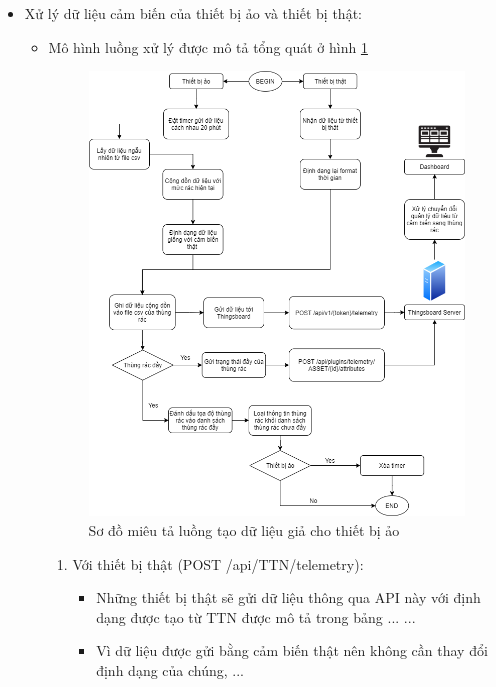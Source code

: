\begin{itemize}
    \item Xử lý dữ liệu cảm biến của thiết bị ảo và thiết bị thật:
    \begin{itemize}  
        \item Mô hình luồng xử lý được mô tả tổng quát ở hình \ref{fig:random_telemetry}
        \begin{figure}[H]
            \centering
            \includegraphics[width=\textwidth]{images/Khanh/Nodejs/Server_Random_Telemetry.png}
            \caption{Sơ đồ miêu tả luồng tạo dữ liệu giả cho thiết bị ảo}
            \label{fig:random_telemetry}
        \end{figure}   
        \begin{enumerate}
            \item Với thiết bị thật (POST /api/TTN/telemetry): 
            \begin{itemize}
                \item Những thiết bị thật sẽ gửi dữ liệu thông qua API này với định dạng được tạo từ TTN được mô tả trong bảng ... 
                ... 
                \item Vì dữ liệu được gửi bằng cảm biến thật nên không cần thay đổi định dạng của chúng, ...

\end{itemize}
\end{enumerate}
\end{itemize}
\end{itemize}

